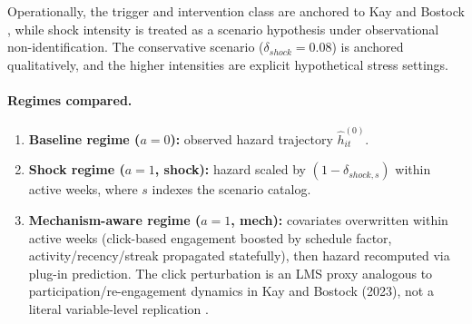 \begin{table}[!t]
\centering
\caption{Scenario-intensity assumptions for shock and shared mechanism-aware schedule (RQ2).}
\label{tab:policy_intensity}
\end{table}

Operationally, the trigger and intervention class are anchored to Kay and Bostock \cite{KayBostock2023PowerNudge}, while shock intensity is treated as a scenario hypothesis under observational non-identification. The conservative scenario ($\delta_{shock}=0.08$) is anchored qualitatively, and the higher intensities are explicit hypothetical stress settings.

\paragraph*{Regimes compared.}
\begin{enumerate}
\item \textbf{Baseline regime ($a=0$):}
observed hazard trajectory $\hat h_{it}^{(0)}$.

\item \textbf{Shock regime ($a=1$, shock):}
hazard scaled by $(1-\delta_{shock,s})$ within active weeks, where $s$ indexes the scenario catalog.

\item \textbf{Mechanism-aware regime ($a=1$, mech):}
covariates overwritten within active weeks (click-based engagement boosted by schedule factor, activity/recency/streak propagated statefully), then hazard recomputed via plug-in prediction. The click perturbation is an LMS proxy analogous to participation/re-engagement dynamics in Kay and Bostock (2023), not a literal variable-level replication \cite{Ahmadi2023LMSEngagementIndicators,Nkomo2021StudentEngagementDigitalTech}.
\end{enumerate}

